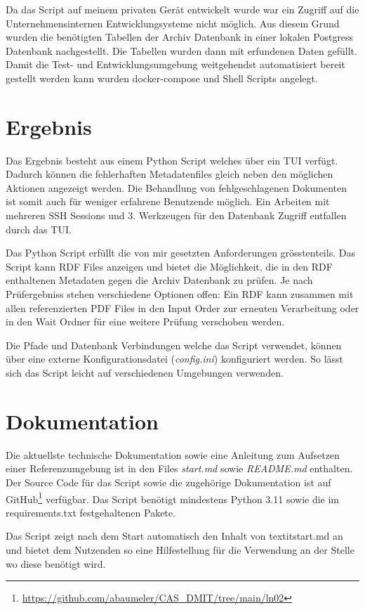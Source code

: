 \documentclass[a4paper,oneside, 12pt]{report}
\begin{document}
Da das Script auf meinem privaten Gerät entwickelt wurde war ein Zugriff auf die Unternehmensinternen Entwicklungsysteme nicht möglich. Aus diesem Grund wurden die benötigten Tabellen der Archiv Datenbank in einer lokalen Postgress Datenbank nachgestellt. Die Tabellen wurden dann mit erfundenen Daten gefüllt. Damit die Test- und Entwicklungsumgebung weitgehendst automatisiert bereit gestellt werden kann wurden docker-compose und Shell Scripts angelegt.


\section{Ergebnis}
Das Ergebnis besteht aus einem Python Script welches über ein \ac{TUI} verfügt. Dadurch können die fehlerhaften Metadatenfiles gleich neben den möglichen Aktionen angezeigt werden. Die Behandlung von fehlgeschlagenen Dokumenten ist somit auch für weniger erfahrene Benutzende möglich. Ein Arbeiten mit mehreren SSH Sessions und 3. Werkzeugen für den Datenbank Zugriff entfallen durch das \ac{TUI}.

Das Python Script erfüllt die von mir gesetzten Anforderungen grösstenteils. Das Script kann RDF Files anzeigen und bietet die Möglichkeit, die in den RDF enthaltenen Metadaten gegen die Archiv Datenbank zu prüfen. Je nach Prüfergebniss stehen verschiedene Optionen offen: Ein RDF kann zusammen mit allen referenzierten PDF Files in den Input Order zur erneuten Verarbeitung oder in den Wait Ordner für eine weitere Prüfung verschoben werden.

Die Pfade und Datenbank Verbindungen welche das Script verwendet, können über eine externe Konfigurationsdatei (\textit{config.ini}) konfiguriert werden. So lässt sich das Script leicht auf verschiedenen Umgebungen verwenden.
 
\section{Dokumentation}
Die aktuellste technische Dokumentation sowie eine Anleitung zum Aufsetzen einer Referenzumgebung ist in den Files \textit{start.md} sowie \textit{README.md} enthalten. Der Source Code für das Script sowie die zugehörige Dokumentation ist auf GitHub\footnote{\url{https://github.com/abaumeler/CAS_DMIT/tree/main/ln02}} verfügbar. Das Script benötigt mindestens Python 3.11 sowie die im requirements.txt festgehaltenen Pakete. 

Das Script zeigt nach dem Start automatisch den Inhalt von textit{start.md} an und bietet dem Nutzenden so eine Hilfestellung für die Verwendung an der Stelle wo diese benötigt wird.
\end{document}
